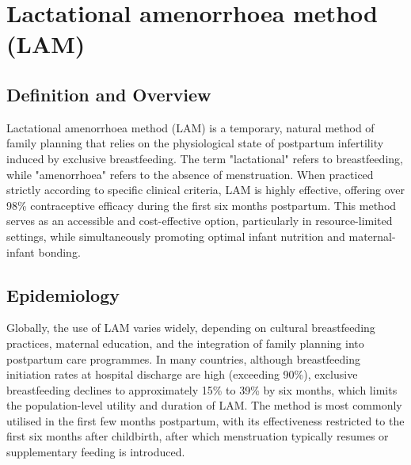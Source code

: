\chapter{Lactational amenorrhoea method (LAM)}

\section*{Definition and Overview}
Lactational amenorrhoea method (LAM) is a temporary, natural method of family planning that relies on the physiological state of postpartum infertility induced by exclusive breastfeeding. The term "lactational" refers to breastfeeding, while "amenorrhoea" refers to the absence of menstruation. When practiced strictly according to specific clinical criteria, LAM is highly effective, offering over 98\% contraceptive efficacy during the first six months postpartum. This method serves as an accessible and cost-effective option, particularly in resource-limited settings, while simultaneously promoting optimal infant nutrition and maternal-infant bonding.

\section*{Epidemiology}
Globally, the use of LAM varies widely, depending on cultural breastfeeding practices, maternal education, and the integration of family planning into postpartum care programmes. In many countries, although breastfeeding initiation rates at hospital discharge are high (exceeding 90\%), exclusive breastfeeding declines to approximately 15\% to 39\% by six months, which limits the population-level utility and duration of LAM. The method is most commonly utilised in the first few months postpartum, with its effectiveness restricted to the first six months after childbirth, after which menstruation typically resumes or supplementary feeding is introduced.

